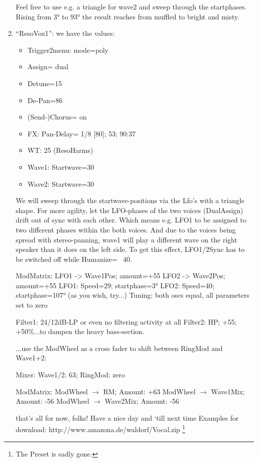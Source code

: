 \begin{example}
\begin{enumerate}
		Feel free to use e.g. a triangle for wave2 and sweep through the startphases. Rising from 3° to 93° the result reaches from muffled to bright and misty.
		\item ``ResoVox1'': we have the values:
		\begin{itemize}
			\item Trigger2menu: mode=poly
			\item Assign= dual
			\item Detune=15
			\item De-Pan=86
			\item (Send-)Chorus= on
			\item FX: Pan-Delay= 1/8 [80]; 53; 90:37
			\item WT: 25 (ResoHarms)
			\item Wave1: Startwave=30
			\item Wave2: Startwave=30
		\end{itemize}
		We will sweep through the startwave-positions via the Lfo’s with a triangle shape. For more agility, let the LFO-phases of the two voices (DualAssign) drift out of sync with each other. Which means e.g. LFO1 to be assigned to two different phases within the both voices. And due to the voices being spread with stereo-panning, wave1 will play a different wave on the right speaker than it does on the left side.
		To get this effect, LFO1/2Sync has to be switched off while Humanize= ~40.
		
		ModMatrix:  LFO1 -> Wave1Pos; amount=+55
		LFO2 -> Wave2Pos; amount=+55
		LFO1: Speed=29; startphase=3°
		LFO2: Speed=40; startphase=107° (as you wish, try...)
		Tuning: both oscs equal, all parameters set to zero
		
		Filter1: 24/12dB-LP or even no filtering activity at all
		Filter2: HP; +55; +50\%...to dampen the heavy bass-section.
		
		...use the ModWheel as a cross fader to shift between RingMod and Wave1+2:
		
		Mixer:  Wave1/2: 63; RingMod: zero
		
		ModMatrix: ModWheel $\to$ RM; Amount: +63
		ModWheel $\to$ Wave1Mix; Amount: -56
		ModWheel $\to$ Wave2Mix; Amount: -56
		
		that's all for now, folks!
		Have a nice day and `till next time
		Examples for download: http://www.amazona.de/waldorf/Vocal.zip \footnote{The Preset is sadly gone.}
	\end{enumerate}
\end{example}
